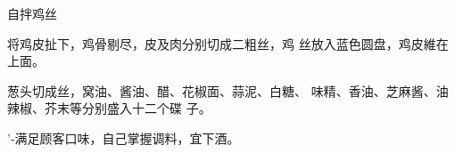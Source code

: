 \begin{recipe}{自拌鸡丝}

\ingredients



\cooking

\step 将鸡皮扯下，鸡骨剔尽，皮及肉分别切成二粗丝，鸡 丝放入蓝色圆盘，鸡皮維在上面。

\step 葱头切成丝，窝油、酱油、醋、花椒面、蒜泥、白糖、 味精、香油、芝麻酱、油辣椒、芥末等分别盛入十二个碟 子。

\notes

'-满足顾客口味，自己掌握调料，宜下酒。

\end{recipe}

